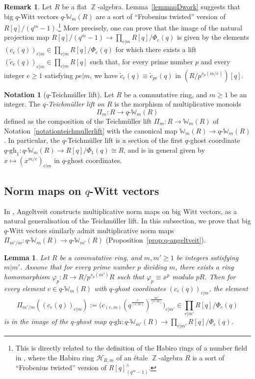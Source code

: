 \documentclass[10pt,twoside]{scrarticle}
\newlength{\mar} \setlength{\mar}{1cm}%
\newlength{\len}
\newtheorem{lemma}[theorem]{Lemma}
\theoremstyle{definition}
\newtheorem{remark}[theorem]{Remark}
\newtheorem{notation}[theorem]{Notation}
\DeclareMathOperator{\Z}{\mathbb{Z}}
\newcommand{\W}{\mathbb{W}}
\newcommand{\Wm}{\mathbb{W}_m}
\newcommand{\qWm}{q\text{-}\mathbb{W}_m}
\newcommand{\qWmm}{q\text{-}\mathbb{W}_{m'}}
\newcommand{\gh}{\mathrm{gh}}
\renewcommand{\ge}{\geqslant}
\numberwithin{equation}{theorem}
\begin{document}
\begin{remark}\label{remarknaiveqDwork}
    Let $R$ be a flat $\Z$-algebra. 
    Lemma~\ref{lemmaqDwork} suggests that big $q$-Witt vectors $\qWm(R)$ are a sort of ``Frobenius twisted'' version of $R[q]/(q^m-1)$.\footnote{This is directly related to the definition of the Habiro rings of a number field in \cite{garoufalidis_habiro_2024,wagner_q-hodge_2025}, where the Habiro ring $\mathcal{H}_{R,m}$ of an étale $\Z$-algebra $R$ is a sort of ``Frobenius twisted'' version of $R[q]^\wedge_{(q^m-1)}$.} More precisely, one can prove that the image of the natural projection map $R[q]/(q^m-1) \rightarrow \prod_{e|m} R[q]/\Phi_e(q)$ is given by the elements $(c_e(q))_{e|m} \in \prod_{e|m} R[q]/\Phi_e(q)$ for which there exists a lift $(\tilde{c}_e(q))_{e|m} \in \prod_{e|m} R[q]$ such that, for every prime number $p$ and every integer $e \ge 1$ satisfying $pe|m$, we have $\tilde{c}_e(q) \equiv \tilde{c}_{pe}(q)$ in $(R/p^{v_p(m/e)})[q]$. 
\end{remark}

\begin{notation}[$q$-Teichmüller lift]\label{notationqteichmullerlift}
    Let $R$ be a commutative ring, and $m \ge 1$ be an integer. The \emph{$q$-Teichmüller lift on $R$} is the morphism of multiplicative monoids
    $$\Pi_m : R \longrightarrow \qWm(R)$$
    defined as the composition of the Teichmüller lift $\Pi_m : R \rightarrow \Wm(R)$ of Notation~\ref{notationteichmullerlift} with the canonical map \hbox{$\W_m(R) \rightarrow \qWm(R)$}. In particular, the $q$-Teichmüller lift is a section of the first $q$-ghost coordinate $q\text{-}\gh_1 : \qWm(R) \rightarrow R[q]/\Phi_1(q) \cong R$, and is in general given by $x \mapsto (x^{m/e})_{e|m}$ in $q$\nobreakdash-ghost coordinates.
\end{notation}

\subsection{Norm maps on $q$-Witt vectors}\label{subsectionnormsonqWittvectors}

In \cite{angeltveit_norm}, Angeltveit constructs multiplicative norm maps on big Witt vectors, as a natural generalisation of the Teichmüller lift. In this subsection, we prove that big $q$-Witt vectors similarly admit multiplicative norm maps $\Pi_{m'/m} : \qWm(R) \rightarrow \qWmm(R)$ (Proposition~\ref{prop:q-angeltveit}). 

\begin{lemma}\label{lemmanormpreserveimageofqghostmap}
    Let $R$ be a commutative ring, and $m,m' \ge 1$ be integers satisfying $m | m'$. Assume that for every prime number $p$ dividing $m$, there exists a ring homomorphism $\varphi_p : R \rightarrow R/p^{v_p(m')}R$ such that $\varphi_p \equiv x^p$ modulo $pR$. Then for every element $c \in \qWm(R)$ with $q$-ghost coordinates $(c_e(q))_{e|m}$,  
    the element $$\Pi_{m'/m}((c_e(q))_{e|m}) := \big(c_{(e,m)}(q^{\frac{e}{(e,m)}})^{\frac{m'}{[e,m]}}\big)_{e|m'} \in \prod_{e|m'} R[q]/\Phi_e(q)$$ is in the image of the $q$-ghost map $q\text{-}\gh : \qWmm(R) \rightarrow \prod_{e | m'} R[q]/\Phi_e(q)$.
\end{lemma}
\end{document}
